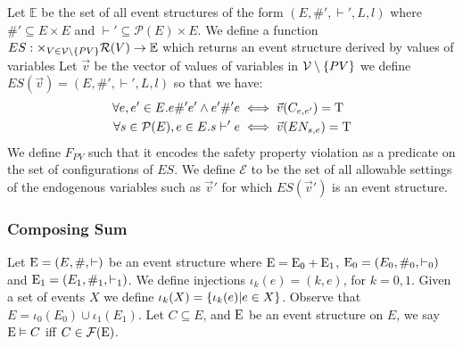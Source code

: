 Let $\mathbb{E}$ be the set of all event structures of the form
$(E,\#',\vdash',L,l)$ where $\#' \subseteq E \times E$
and $\vdash' \subseteq \mathcal{P}(E) \times E$.
We define a function
$ES: \times_{V \in \mathcal{V}\setminus \{PV\}} \mathcal{R}(V) \rightarrow \mathbb{E}$
which returns an event structure derived by values of variables
Let $\vec v$ be the vector of values of variables in
$\mathcal{V} \setminus \{PV\}$
we define $ES(\vec v) = (E,\#',\vdash', L,l)$ so that we have:
\begin{align*}
    \forall e,e' \in E. e \#' e' \wedge e' \#' e
     & \iff \vec{v}(C_{e,e'}) = \mathrm{T} \\
    \forall s \in \mathcal{P}(E), e \in E.  s \vdash' e
     & \iff \vec{v}(EN_{s,e}) = \mathrm{T}
\end{align*}
We define $F_{PV}$ such that it encodes the safety property violation
as a predicate on the set of configurations of $ES$.
We define $\mathcal{E}$ to be the set of all allowable
settings of the endogenous variables such as $\vec v'$
for which $ES(\vec v')$ is an event structure.

\subsubsection{Composing Sum}
Let $\mathrm{E} = (E,\#,\vdash)$ be an event structure where
$\mathrm{E} = \mathrm{E}_0 + \mathrm{E}_1$,
$\mathrm{E}_0 = (E_0,\#_0,\vdash_0)$ and
$\mathrm{E}_1 = (E_1,\#_1,\vdash_1)$.
We define injections $\iota_k(e) = (k,e)$, for $k=0,1$.
Given a set of events $X$ we define
$\iota_k(X) = \{\iota_k(e)|e \in X\}$.
Observe that $E = \iota_0(E_0) \cup \iota_1(E_1)$.
Let $C \subseteq E$, and $\mathrm{E}$ be an event structure on $E$, we say
$\mathrm{E} \vDash C$ iff $C \in \mathcal{F}(\mathrm{E})$.

